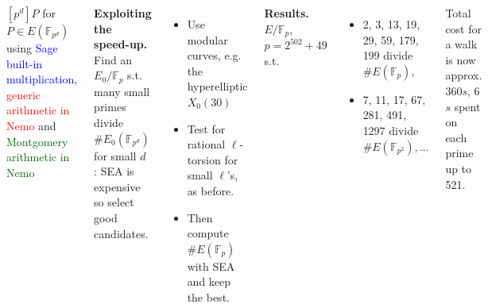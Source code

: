 \documentclass[25pt,a0paper,blockverticalspace=20mm]{tikzposter}
\def\F {\ensuremath{\mathbb{F}}}
\renewcommand{\paragraph}[1]{\smallskip\textbf{#1.}}
\begin{document}
\begin{columns}
{\begin{center}

\small $[p^d] P$ for $P \in E(\F_{p^d})$ using
\textcolor{blue}{Sage built-in multiplication},
\textcolor{red}{generic arithmetic in Nemo} and
\textcolor{darkgreen}{Montgomery arithmetic in Nemo}

\end{center}

\paragraph{Exploiting the speed-up} Find an $E_0/\F_p$ s.t. many small primes divide $\# E_0(\F_{p^d})$ for small $d$ : SEA is expensive so select good candidates.
\begin{itemize}
\item Use modular curves, e.g. the hyperelliptic $X_0(30)$
\item Test for rational $\ell$-torsion for small $\ell$'s, as before.
\item Then compute $\#E(\F_p)$ with SEA and keep the best.
\end{itemize}

\paragraph{Results} $E/\F_p$, $p = 2^{502} + 49$ s.t.
\begin{itemize}
\item  2, 3, 13, 19, 29, 59, 179, 199 divide $\#E(\F_p)$,
\item 7, 11, 17, 67, 281, 491, 1297 divide $\#E(\F_{p^2}), \ldots$
\end{itemize}
Total cost for a walk is now approx. 360$s$, 6$s$ spent on each prime up to 521.

}





\end{columns}
\end{document}
